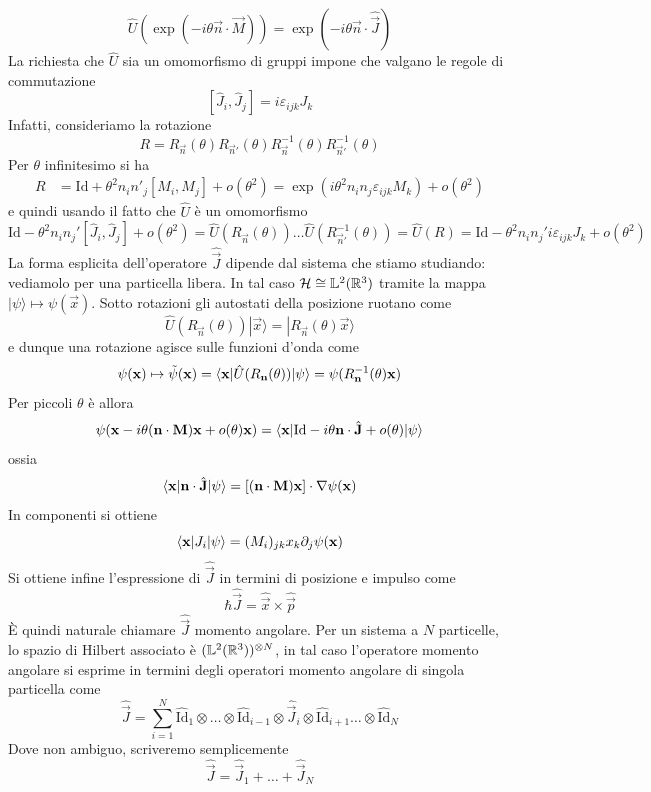 \documentclass[a4paper, 11pt]{article}
\newcommand{\op}[1]{\hat{#1}}
\renewcommand{\H}{\mathcal{H}}
\newcommand{\id}{\mathrm{Id}}
\renewcommand{\op}[1]{\hat{#1}}
\renewcommand{\L}{\mathbb{L}}
\renewcommand{\ket}[1]{| #1\rangle}
\begin{document}
\[\op U(\exp(-i\theta\vec{n}\cdot\vec{M}))=\exp(-i\theta\vec{n}\cdot\op{\vec{J}})\]
La richiesta che $\op U$ sia un omomorfismo di gruppi impone che valgano le regole di commutazione
\[[\op J_i,\op J_j]=i\varepsilon_{ijk}J_k\]
Infatti, consideriamo la rotazione
\[R=R_\vec{n}(\theta)R_{\vec{n}'}(\theta)R_\vec{n}^{-1}(\theta)R_{\vec{n}'}^{-1}(\theta)\]
Per $\theta$ infinitesimo si ha
\begin{align*}R&=\id+\theta^2n_in'_j[M_i,M_j]+o(\theta^2)=\exp(i\theta^2n_in_j\varepsilon_{ijk}M_k)+o(\theta^2)
	\end{align*}
e quindi usando il fatto che $\op U$ è un omomorfismo
\[\id-\theta^2n_in_j'[\op J_i,\op J_j]+o(\theta^2)=\op U(R_\vec{n}(\theta))\dots\op U(R^{-1}_{\vec{n}'}(\theta))=\op U(R)=\id-\theta^2n_in_j'i\varepsilon_{ijk}J_k+o(\theta^2)\]
La forma esplicita dell'operatore $\op{\vec{J}}$ dipende dal sistema che stiamo studiando: vediamolo per una particella libera. In tal caso $\H\cong\L^2(\R ^3)$ tramite la mappa $\ket{\psi}\mapsto\psi(\vec{x})$. Sotto rotazioni gli autostati della posizione ruotano come
\[\op U(R_\vec{n}(\theta))\ket{\vec{x}}=\ket{R_\vec{n}(\theta)\vec{x}}\]
e dunque una rotazione agisce sulle funzioni d'onda come
\[\psi(\vec{x})\mapsto\tilde\psi(\vec{x})=\braketop{\vec{x}}{\op U(R_\vec{n}(\theta))}{\psi}=\psi(R^{-1}_\vec{n}(\theta)\vec{x})\]
Per piccoli $\theta$ è allora
\[\psi(\vec{x}-i\theta(\vec{n}\cdot\vec{M})\vec{x}+o(\theta)\vec{x})=\braketop{\vec{x}}{\id-i\theta\vec{n}\cdot\op{\vec{J}}+o(\theta)}{\psi}\]
ossia
\[\braketop{\vec{x}}{\vec{n}\cdot\op{\vec{J}}}{\psi}=[(\vec{n}\cdot\vec{M})\vec{x}]\cdot\nabla\psi(\vec{x})\]
In componenti si ottiene
\[\langle\mathbf{x}|J_i|\psi\rangle=(M_i)_{jk}x_k\partial_j\psi(\mathbf{x})\]
Si ottiene infine l'espressione di $\op{\vec{J}}$ in termini di posizione e impulso come
\[\hbar\op{\vec{J}}=\op{\vec{x}}\times\op{\vec p}\]
\`{E} quindi naturale chiamare $\op{\vec{J}}$ momento angolare. Per un sistema a $N$ particelle, lo spazio di Hilbert associato è $(\L^2(\R ^3))^{\otimes N}$, in tal caso l'operatore momento angolare si esprime in termini degli operatori momento angolare di singola particella come
\[\op{\vec{J}}=\sum_{i=1}^{N}\op{\id}_1\otimes\dots\otimes\op{\id}_{i-1}\otimes\op{\vec{J}}_i\otimes\op{\id}_{i+1}\dots\otimes\op{\id}_N\]
Dove non ambiguo, scriveremo semplicemente
\[\op{\vec{J}}=\op{\vec{J}}_1+\dots+\op{\vec{J}}_N\]
\end{document}
